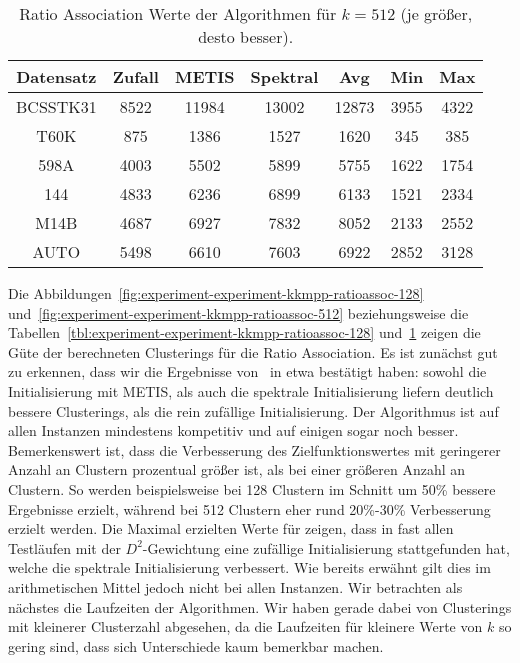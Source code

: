 \begin{table}[h!]
\centering
\begin{tabular}{@{}ccccccc@{}} \toprule
	\textbf{Datensatz} & \textbf{Zufall} & \textbf{METIS} & \textbf{Spektral} & \textbf{Avg} & \textbf{Min} & \textbf{Max} \\ \midrule
	BCSSTK31 	& 8522 & 11984 & 13002 & 12873 & 3955 & 4322 \\
	T60K 		& 875 & 1386 & 1527 & 1620 & 345 & 385 \\
	598A 		& 4003 & 5502 & 5899 & 5755 & 1622 & 1754 \\
	144 		& 4833 & 6236 & 6899 & 6133 & 1521 & 2334 \\
	M14B 		& 4687 & 6927 & 7832 & 8052 & 2133 & 2552 \\
	AUTO 		& 5498 & 6610 & 7603 & 6922 & 2852 & 3128 \\
	\bottomrule
\end{tabular}
\caption{Ratio Association Werte der Algorithmen für $k = 512$ (je größer, desto besser).}
\label{tbl:experiment-experiment-kkmpp-ratioassoc-512}
\end{table}

Die Abbildungen~\ref{fig:experiment-experiment-kkmpp-ratioassoc-128} und~\ref{fig:experiment-experiment-kkmpp-ratioassoc-512}
beziehungsweise die Tabellen~\ref{tbl:experiment-experiment-kkmpp-ratioassoc-128}
und~\ref{tbl:experiment-experiment-kkmpp-ratioassoc-512} zeigen die Güte der berechneten Clusterings für die Ratio Association.
Es ist zunächst gut zu erkennen, dass wir die Ergebnisse von~\cite{DhillonGK04} in etwa bestätigt haben: sowohl die
Initialisierung mit METIS, als auch die spektrale Initialisierung liefern deutlich bessere Clusterings, als die rein zufällige
Initialisierung. Der Algorithmus \kkmpp{} ist auf allen Instanzen mindestens kompetitiv und auf einigen sogar noch besser.
Bemerkenswert ist, dass die Verbesserung des Zielfunktionswertes mit geringerer Anzahl an Clustern prozentual größer ist,
als bei einer größeren Anzahl an Clustern. So werden beispielsweise bei 128 Clustern im Schnitt um 50\% bessere Ergebnisse
erzielt, während bei 512 Clustern eher rund 20\%-30\% Verbesserung erzielt werden. Die Maximal erzielten Werte für
\kkmpp{} zeigen, dass in fast allen Testläufen mit der $D^2$-Gewichtung eine zufällige Initialisierung stattgefunden hat, welche
die spektrale Initialisierung verbessert. Wie bereits erwähnt gilt dies im arithmetischen Mittel jedoch nicht bei allen Instanzen.
\absatz
Wir betrachten als nächstes die Laufzeiten der Algorithmen. Wir haben gerade dabei von Clusterings
mit kleinerer Clusterzahl abgesehen, da die Laufzeiten für kleinere Werte von $k$ so gering sind, dass sich Unterschiede kaum
bemerkbar machen.
\phantom{Dieser Platz ist nötig, um die \LaTeX-Float-Umgebungen nicht zu verwirren!}

